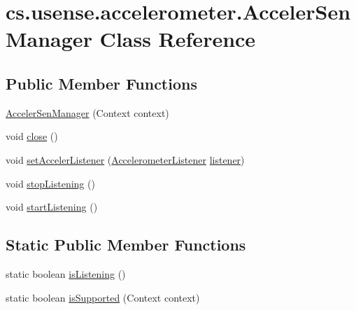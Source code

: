\hypertarget{classcs_1_1usense_1_1accelerometer_1_1_acceler_sen_manager}{}\section{cs.\+usense.\+accelerometer.\+Acceler\+Sen\+Manager Class Reference}
\label{classcs_1_1usense_1_1accelerometer_1_1_acceler_sen_manager}
\subsection*{Public Member Functions}
\begin{DoxyCompactItemize}
\item 
\hyperlink{classcs_1_1usense_1_1accelerometer_1_1_acceler_sen_manager_a71edb1c313c34b381be833cec8b7eefd}{Acceler\+Sen\+Manager} (Context context)
\item 
void \hyperlink{classcs_1_1usense_1_1accelerometer_1_1_acceler_sen_manager_a6b4e206d0c735ab79bebed17c8339351}{close} ()
\item 
void \hyperlink{classcs_1_1usense_1_1accelerometer_1_1_acceler_sen_manager_a1854acf3df1e837047cf66324a3e4b1b}{set\+Acceler\+Listener} (\hyperlink{interfacecs_1_1usense_1_1accelerometer_1_1_accelerometer_listener}{Accelerometer\+Listener} \hyperlink{classcs_1_1usense_1_1accelerometer_1_1_acceler_sen_manager_a278bf3a86e3b16f38808b6956e3ece8d}{listener})
\item 
void \hyperlink{classcs_1_1usense_1_1accelerometer_1_1_acceler_sen_manager_a18dcbc7fb85a0c5159220cbad5e76452}{stop\+Listening} ()
\item 
void \hyperlink{classcs_1_1usense_1_1accelerometer_1_1_acceler_sen_manager_a602565d47f6a387586e4b057e3232663}{start\+Listening} ()
\end{DoxyCompactItemize}
\subsection*{Static Public Member Functions}
\begin{DoxyCompactItemize}
\item 
static boolean \hyperlink{classcs_1_1usense_1_1accelerometer_1_1_acceler_sen_manager_ac42f92de93bc4f5951c2c9f847aacde3}{is\+Listening} ()
\item 
static boolean \hyperlink{classcs_1_1usense_1_1accelerometer_1_1_acceler_sen_manager_a33288ec94080028c794e73bb2dda74c9}{is\+Supported} (Context context)
\end{DoxyCompactItemize}
